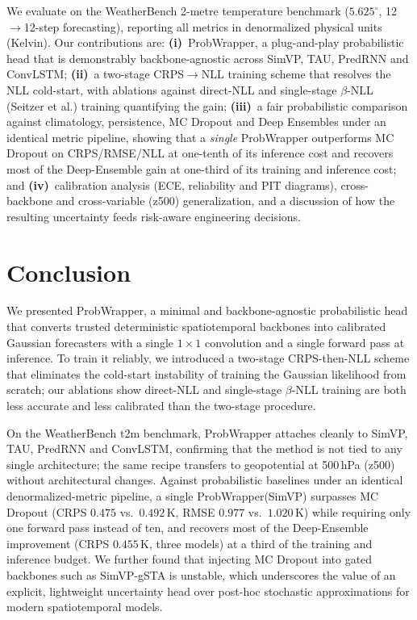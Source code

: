 We evaluate on the WeatherBench 2-metre temperature benchmark ($5.625^\circ$, 12$\rightarrow$12-step forecasting), reporting all metrics in denormalized physical units (Kelvin).
Our contributions are:
\textbf{(i)}~ProbWrapper, a plug-and-play probabilistic head that is demonstrably backbone-agnostic across SimVP, TAU, PredRNN and ConvLSTM;
\textbf{(ii)}~a two-stage CRPS$\rightarrow$NLL training scheme that resolves the NLL cold-start, with ablations against direct-NLL and single-stage $\beta$-NLL (Seitzer et al.) training quantifying the gain;
\textbf{(iii)}~a fair probabilistic comparison against climatology, persistence, MC Dropout and Deep Ensembles under an identical metric pipeline, showing that a \emph{single} ProbWrapper outperforms MC Dropout on CRPS/RMSE/NLL at one-tenth of its inference cost and recovers most of the Deep-Ensemble gain at one-third of its training and inference cost; and
\textbf{(iv)}~calibration analysis (ECE, reliability and PIT diagrams), cross-backbone and cross-variable (z500) generalization, and a discussion of how the resulting uncertainty feeds risk-aware engineering decisions.

\section{Conclusion}
\label{sec:conclusion}

We presented ProbWrapper, a minimal and backbone-agnostic probabilistic head that converts trusted deterministic spatiotemporal backbones into calibrated Gaussian forecasters with a single $1\times1$ convolution and a single forward pass at inference.
To train it reliably, we introduced a two-stage CRPS-then-NLL scheme that eliminates the cold-start instability of training the Gaussian likelihood from scratch; our ablations show direct-NLL and single-stage $\beta$-NLL training are both less accurate and less calibrated than the two-stage procedure.

On the WeatherBench t2m benchmark, ProbWrapper attaches cleanly to SimVP, TAU, PredRNN and ConvLSTM, confirming that the method is not tied to any single architecture; the same recipe transfers to geopotential at 500\,hPa (z500) without architectural changes.
Against probabilistic baselines under an identical denormalized-metric pipeline, a single ProbWrapper(SimVP) surpasses MC Dropout (CRPS $0.475$ vs.\ $0.492$\,K, RMSE $0.977$ vs.\ $1.020$\,K) while requiring only one forward pass instead of ten, and recovers most of the Deep-Ensemble improvement (CRPS $0.455$\,K, three models) at a third of the training and inference budget.
We further found that injecting MC Dropout into gated backbones such as SimVP-gSTA is unstable, which underscores the value of an explicit, lightweight uncertainty head over post-hoc stochastic approximations for modern spatiotemporal models.

